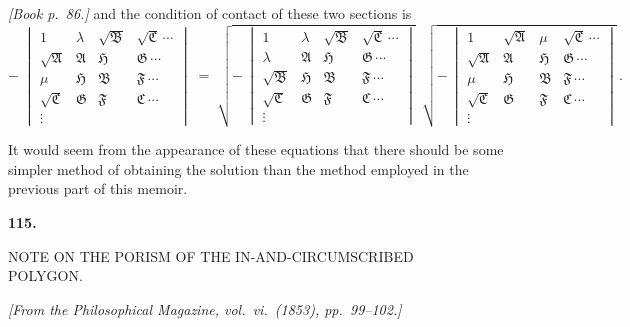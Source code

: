 \documentclass[11pt]{article}
\providecommand{\fA}{\mathfrak{A}}
\providecommand{\fB}{\mathfrak{B}}
\providecommand{\fC}{\mathfrak{C}}
\providecommand{\fF}{\mathfrak{F}}
\providecommand{\fG}{\mathfrak{G}}
\providecommand{\fH}{\mathfrak{H}}
\begin{document}
\bigskip

\noindent\emph{[Book p.~86.]} and the condition of contact of these two sections is
\[
-\;\begin{vmatrix} 1 & \lambda & \sqrt{\fB} & \sqrt{\fC}\,\cdots \\ \sqrt{\fA} & \fA & \fH & \fG\,\cdots \\ \mu & \fH & \fB & \fF\,\cdots \\ \sqrt{\fC} & \fG & \fF & \fC\,\cdots \\ \vdots \end{vmatrix}
\;=\;\sqrt{-\,\begin{vmatrix} 1 & \lambda & \sqrt{\fB} & \sqrt{\fC}\,\cdots \\ \lambda & \fA & \fH & \fG\,\cdots \\ \sqrt{\fB} & \fH & \fB & \fF\,\cdots \\ \sqrt{\fC} & \fG & \fF & \fC\,\cdots \\ \vdots \end{vmatrix}}\;\,
\sqrt{-\,\begin{vmatrix} 1 & \sqrt{\fA} & \mu & \sqrt{\fC}\,\cdots \\ \sqrt{\fA} & \fA & \fH & \fG\,\cdots \\ \mu & \fH & \fB & \fF\,\cdots \\ \sqrt{\fC} & \fG & \fF & \fC\,\cdots \\ \vdots \end{vmatrix}}\,.
\]

It would seem from the appearance of these equations that there should be some simpler method of obtaining the solution than the method employed in the previous part of this memoir.

\bigskip


\clearpage

\begin{center}\textbf{115.}\par\medskip
{\large NOTE ON THE PORISM OF THE IN-AND-CIRCUMSCRIBED\\
POLYGON.}
\end{center}

\noindent\emph{[From the Philosophical Magazine, vol.\ vi.\ (1853), pp.\ 99--102.]}

\bigskip
\end{document}

